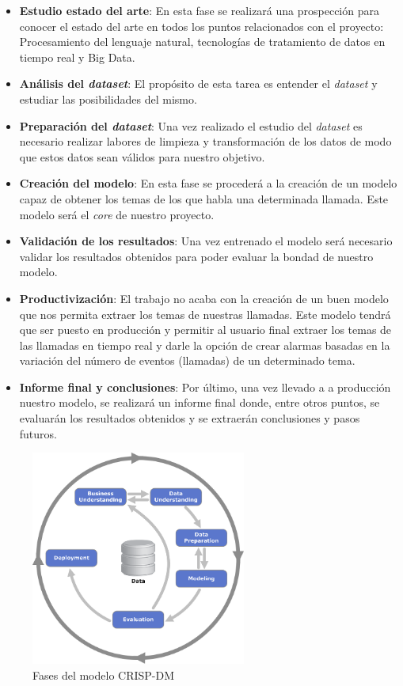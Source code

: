 \begin{itemize}
	\item \textbf{Estudio estado del arte}: En esta fase se realizará una prospección para conocer el estado del arte en todos los puntos relacionados con el proyecto: Procesamiento del lenguaje natural, tecnologías de tratamiento de datos en tiempo real y Big Data. 
	
	\item \textbf{Análisis del \textit{dataset}}: El propósito de esta tarea es entender el \textit{dataset}  y estudiar las posibilidades del mismo. 
	
	\item\textbf{ Preparación del \textit{dataset}}: Una vez realizado el estudio del \textit{dataset} es necesario realizar labores de limpieza y transformación de los datos de modo que estos datos sean válidos para nuestro objetivo.
	
	\item \textbf{Creación del modelo}: En esta fase se procederá a la creación de un modelo capaz de obtener los temas de los que habla una determinada llamada. Este modelo será el \textit{core} de nuestro proyecto.
	
	\item \textbf{Validación de los resultados}: Una vez entrenado el modelo será necesario validar los resultados obtenidos para poder evaluar la bondad de nuestro modelo. 
	
	\item\textbf{ Productivización}: El trabajo no acaba con la creación de un buen modelo que nos permita extraer los temas de nuestras llamadas. Este modelo tendrá que ser puesto en producción y permitir al usuario final extraer los temas de las llamadas en tiempo real y darle la opción de crear alarmas basadas en la variación del número de eventos (llamadas) de un determinado tema.
	\item\textbf{ Informe final y conclusiones}: Por último, una vez llevado a a producción nuestro modelo, se realizará un informe final donde, entre otros puntos, se evaluarán los resultados obtenidos y se extraerán conclusiones y pasos futuros.
\end{itemize} 

\begin{figure}[!ht]
	\centering
	\includegraphics[width=0.63\textwidth]{images/intro/crispdm}
	\caption{Fases del modelo CRISP-DM}
	\label{fig:crispdm}
\end{figure}


